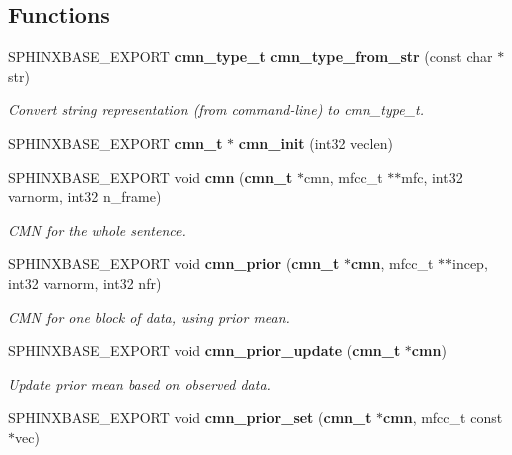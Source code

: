 \subsection*{Functions}
\begin{DoxyCompactItemize}
\item 
S\+P\+H\+I\+N\+X\+B\+A\+S\+E\+\_\+\+E\+X\+P\+O\+R\+T {\bf cmn\+\_\+type\+\_\+t} {\bf cmn\+\_\+type\+\_\+from\+\_\+str} (const char $\ast$str)\label{cmn_8h_acf5e65a03a0d74630add4a400fed0ce8}

\begin{DoxyCompactList}\small\item\em Convert string representation (from command-\/line) to cmn\+\_\+type\+\_\+t. \end{DoxyCompactList}\item 
S\+P\+H\+I\+N\+X\+B\+A\+S\+E\+\_\+\+E\+X\+P\+O\+R\+T {\bf cmn\+\_\+t} $\ast$ {\bfseries cmn\+\_\+init} (int32 veclen)\label{cmn_8h_a7ba6ce5489afce232b9bb61bd2ebd20f}

\item 
S\+P\+H\+I\+N\+X\+B\+A\+S\+E\+\_\+\+E\+X\+P\+O\+R\+T void {\bf cmn} ({\bf cmn\+\_\+t} $\ast$cmn, mfcc\+\_\+t $\ast$$\ast$mfc, int32 varnorm, int32 n\+\_\+frame)
\begin{DoxyCompactList}\small\item\em C\+M\+N for the whole sentence. \end{DoxyCompactList}\item 
S\+P\+H\+I\+N\+X\+B\+A\+S\+E\+\_\+\+E\+X\+P\+O\+R\+T void {\bf cmn\+\_\+prior} ({\bf cmn\+\_\+t} $\ast${\bf cmn}, mfcc\+\_\+t $\ast$$\ast$incep, int32 varnorm, int32 nfr)
\begin{DoxyCompactList}\small\item\em C\+M\+N for one block of data, using prior mean. \end{DoxyCompactList}\item 
S\+P\+H\+I\+N\+X\+B\+A\+S\+E\+\_\+\+E\+X\+P\+O\+R\+T void {\bf cmn\+\_\+prior\+\_\+update} ({\bf cmn\+\_\+t} $\ast${\bf cmn})\label{cmn_8h_aae61df2ec71082520669fc63d94bb1ef}

\begin{DoxyCompactList}\small\item\em Update prior mean based on observed data. \end{DoxyCompactList}\item 
S\+P\+H\+I\+N\+X\+B\+A\+S\+E\+\_\+\+E\+X\+P\+O\+R\+T void {\bf cmn\+\_\+prior\+\_\+set} ({\bf cmn\+\_\+t} $\ast${\bf cmn}, mfcc\+\_\+t const $\ast$vec)\label{cmn_8h_a0f6f70d51143d6a33130650b8d4758ab}


\end{DoxyCompactItemize}

